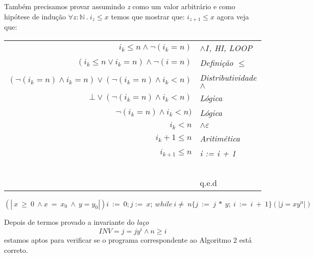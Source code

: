  Também precisamos provar assumindo \emph{z} como um valor arbitrário e como
 hipótese de indução $\forall z : \mathbb{N}\ .\ i_z \leq x$ temos que mostrar
 que: $i_{z+1} \leq x$ agora veja que:
 \begin{center}
     \begin{tabular}{rl}
         \emph{$i_k \leq n \land \neg(i_k = n)$}& \emph{$\land I$, HI, LOOP} \\
         \emph{$(i_k \leq n \vee i_k = n)\land \neg(i = n)$}&\emph{Definição $\leq$} \\
         \emph{$(\neg (i_k = n)\land i_k = n) \vee (\neg (i_k = n) \land i_k < n)$}&\emph{Distributividade $\land$} \\
         \emph{$\bot \vee (\neg(i_k = n) \land i_k < n)$}&\emph{Lógica} \\
         \emph{$\neg(i_k = n) \land i_k < n)$}&\emph{Lógica} \\
         \emph{$i_k < n$}&\emph{$\land \varepsilon$} \\
         \emph{$i_k +1 \leq n$}&\emph{Aritimética} \\
         \emph{$i_{k + 1} \leq n$}&\emph{i := i + 1} \\
         ~&~\\
         ~&q.e.d\\
     \end{tabular}
 \end{center}
$$(\!|\ x\ \geq\ 0\ \wedge x\ =\ x_0\ \wedge\ y=y_0|\!) i\ :=\ 0; j :=\ x;\
while\ i \neq\ n \{j\ :=\ j\ *\ y;\ i\ :=\ i\ +\ 1\}(\!| j=x y^n |\!) $$

Depois de termos provado a invariante do \emph{laço} \[INV = j = jy^i \land n
\geq i\] estamos aptos para verificar se o programa correspondente ao Algoritmo
2 está correto.

